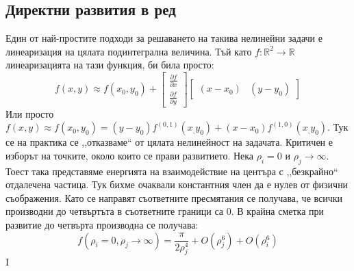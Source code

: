 \subsection{Директни развития в ред}
Един от най-простите подходи за решаването на такива нелинейни задачи е линеаризация на цялата подинтегрална величина. Тъй като $f: \mathbb{R}^2 \rightarrow \mathbb{R}$ линеаризацията на тази функция, би била просто:
\begin{equation*}
	f(x,y) \approx f(x_0,y_0) + \begin{bmatrix}
		\frac{\partial f}{\partial x} \\
		\frac{\partial f}{\partial y} 
	\end{bmatrix} 
	\begin{bmatrix}
		(x-x_0) & (y-y_0)
	\end{bmatrix}
\end{equation*}
Или просто $f(x,y) \approx f(x_0, y_0) = (y-y_0) f^{(0,1)}(x_,y_0)+ (x-x_0) f^{(1,0)}(x_,y_0)$.
Тук се на практика се ,,отказваме`` от цялата нелинейност на задачата. Критичен е изборът на точките, около които се прави развитието.
Нека $\rho_i = 0$ и $\rho_j \rightarrow \infty$. Тоест така представяме енергията на взаимодействие на центъра с ,,безкрайно`` отдалечена частица.
Тук бихме очаквали константния член да е нулев от физични съображения. Като се направят съответните пресмятания се получава, че всички производни до четвъртъта в съответните граници са 0.
В крайна сметка при развитие до четвърта производна се получава:
\begin{equation*}
	f(\rho_i = 0, \rho_j \rightarrow \infty) = \frac{\pi}{2 \rho_{j}^4} + O(\rho_{j}^6) + O(\rho_{i}^6) 
\end{equation*}
I
